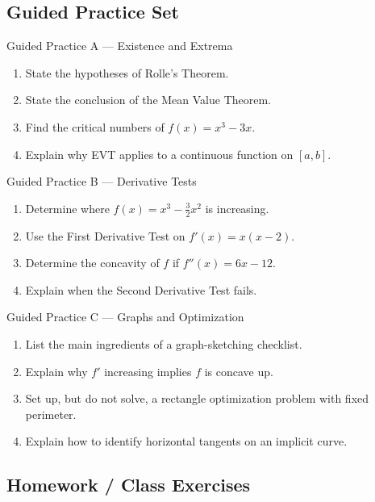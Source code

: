 \documentclass[11pt]{article}
\begin{document}
\newpage
\subsection{Guided Practice Set}

\begin{practicebox}{Guided Practice A --- Existence and Extrema}
\begin{enumerate}
    \item State the hypotheses of Rolle’s Theorem.
    \item State the conclusion of the Mean Value Theorem.
    \item Find the critical numbers of $f(x)=x^3-3x$.
    \item Explain why EVT applies to a continuous function on $[a,b]$.
\end{enumerate}
\end{practicebox}

\begin{practicebox}{Guided Practice B --- Derivative Tests}
\begin{enumerate}
    \item Determine where $f(x)=x^3-\frac32x^2$ is increasing.
    \item Use the First Derivative Test on $f'(x)=x(x-2)$.
    \item Determine the concavity of $f$ if $f''(x)=6x-12$.
    \item Explain when the Second Derivative Test fails.
\end{enumerate}
\end{practicebox}

\begin{practicebox}{Guided Practice C --- Graphs and Optimization}
\begin{enumerate}
    \item List the main ingredients of a graph-sketching checklist.
    \item Explain why $f'$ increasing implies $f$ is concave up.
    \item Set up, but do not solve, a rectangle optimization problem with fixed perimeter.
    \item Explain how to identify horizontal tangents on an implicit curve.
\end{enumerate}
\end{practicebox}

\newpage
\subsection{Homework / Class Exercises}
\end{document}
